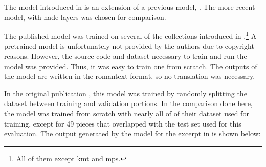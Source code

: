 
The model introduced in \textcite{micchi2021deep} is an
extension of a previous model, \textcite{micchi2020not}. The
more recent model, with \gls{nade} layers was chosen for
comparison.

The published model was trained on several of the
collections introduced in
.\footnote{All of
them except \gls{kmt} and \gls{mps}.} A pretrained model is
unfortunately not provided by the authors due to copyright
reasons. However, the source code and dataset necessary to
train and run the model was provided. Thus, it was easy to
train one from scratch. The outputs of the model are written
in the \gls{romantext} format, so no translation was
necessary. 

In the original publication \parencite{micchi2021deep}, this
model was trained by randomly splitting the dataset between
training and validation portions. In the comparison done
here, the model was trained from scratch with nearly all of
of their dataset used for training, except for 49 pieces
that overlapped with the test set used for this evaluation.
The output generated by the model for the excerpt in
 is shown below:
